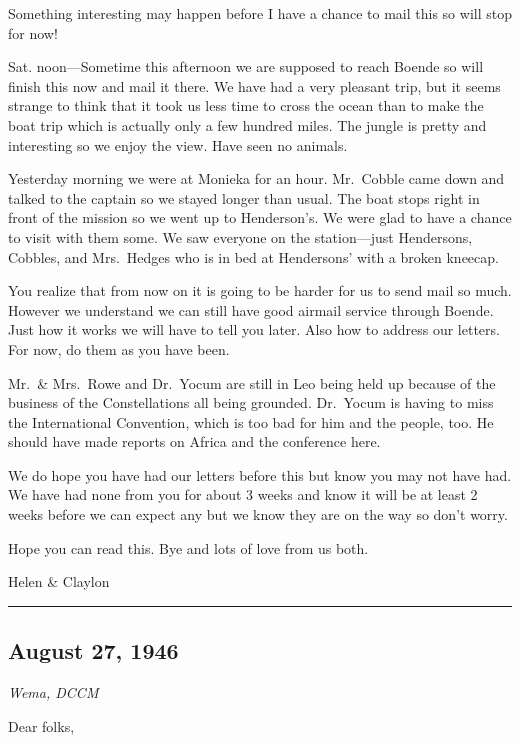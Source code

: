 \documentclass[
]{book}
\begin{document}
Something interesting may happen before I have a chance to mail this so will stop for now!

Sat. noon---Sometime this afternoon we are supposed to reach Boende so will finish this now and mail it there. We have had a very pleasant trip, but it seems strange to think that it took us less time to cross the ocean than to make the boat trip which is actually only a few hundred miles. The jungle is pretty and interesting so we enjoy the view. Have seen no animals.

Yesterday morning we were at Monieka for an hour. Mr.~Cobble came down and talked to the captain so we stayed longer than usual. The boat stops right in front of the mission so we went up to Henderson's. We were glad to have a chance to visit with them some. We saw everyone on the station---just Hendersons, Cobbles, and Mrs.~Hedges who is in bed at Hendersons' with a broken kneecap.

You realize that from now on it is going to be harder for us to send mail so much. However we understand we can still have good airmail service through Boende. Just how it works we will have to tell you later. Also how to address our letters. For now, do them as you have been.

Mr.~\& Mrs.~Rowe and Dr.~Yocum are still in Leo being held up because of the business of the Constellations all being grounded. Dr.~Yocum is having to miss the International Convention, which is too bad for him and the people, too. He should have made reports on Africa and the conference here.

We do hope you have had our letters before this but know you may not have had. We have had none from you for about 3 weeks and know it will be at least 2 weeks before we can expect any but we know they are on the way so don't worry.

Hope you can read this. Bye and lots of love from us both.

Helen \& Claylon

\begin{center}\rule{0.5\linewidth}{0.5pt}\end{center}

\hypertarget{august-27-1946}{%
\subsection{August 27, 1946}\label{august-27-1946}}

\emph{Wema, DCCM}

Dear folks,
\end{document}
